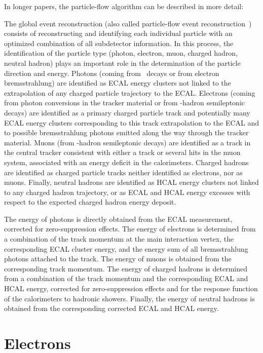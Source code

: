 In longer papers, the particle-flow algorithm can be described in more detail:

The global event reconstruction (also called particle-flow event reconstruction~\cite{CMS-PAS-PFT-09-001,CMS-PAS-PFT-10-001}) consists of reconstructing and identifying each individual particle with an optimized combination of all subdetector information.
In this process, the identification of the particle type (photon, electron, muon, charged hadron, neutral hadron) plays an important role in the determination of the particle direction and energy.
Photons (\eg coming from \Pgpz\ decays or from electron bremsstrahlung) are identified as ECAL energy clusters not linked to the extrapolation of any charged particle trajectory to the ECAL.
Electrons (\eg coming from photon conversions in the tracker material or from \cPqb-hadron semileptonic decays) are identified as a primary charged particle track and potentially many ECAL energy clusters corresponding to this track extrapolation to the ECAL and to possible bremsstrahlung photons emitted along the way through the tracker material.
Muons (\eg from \cPqb-hadron semileptonic decays) are identified as a track in the central tracker consistent with either a track or several hits in the muon system, associated with an energy deficit in the calorimeters.
Charged hadrons are identified as charged particle tracks neither identified as electrons, nor as muons.
Finally, neutral hadrons are identified as HCAL energy clusters not linked to any charged hadron trajectory, or as ECAL and HCAL energy excesses with respect to the expected charged hadron energy deposit.

The energy of photons is directly obtained from the ECAL measurement, corrected for zero-suppression effects.
The energy of electrons is determined from a combination of the track momentum at the main interaction vertex, the corresponding ECAL cluster energy, and the energy sum of all bremsstrahlung photons attached to the track.
The energy of muons is obtained from the corresponding track momentum.
The energy of charged hadrons is determined from a combination of the track momentum and the corresponding ECAL and HCAL energy, corrected for zero-suppression effects and for the response function of the calorimeters to hadronic showers.
Finally, the energy of neutral hadrons is obtained from the corresponding corrected ECAL and HCAL energy.


\section{Electrons}

